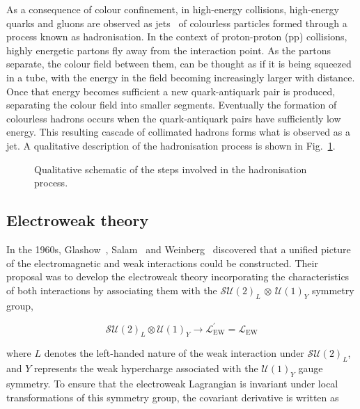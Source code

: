 As a consequence of colour confinement, in high-energy collisions, high-energy quarks and gluons are observed as jets~\cite{Hadronisation_Jets} of colourless particles formed through a process known as hadronisation. In the context of proton-proton (pp) collisions, highly energetic partons fly away from the interaction point. As the partons separate, the colour field between them, can be thought as if it is being squeezed in a tube, with the energy in the field becoming increasingly larger with distance. Once that energy becomes sufficient a new quark-antiquark pair is produced, separating the colour field into smaller segments. Eventually the formation of colourless hadrons occurs when the quark-antiquark pairs have sufficiently low energy. This resulting cascade of collimated hadrons forms what is observed as a jet. A qualitative description of the hadronisation process is shown in Fig.~\ref{Figure:Introduction_ColourConfinement}.

\begin{figure}[h]
    \centering
    
    \caption{Qualitative schematic of the steps involved in the hadronisation process.}
    \label{Figure:Introduction_ColourConfinement}
\end{figure}

\subsection{Electroweak theory}

In the 1960s, Glashow~\cite{Glashow_1}, Salam~\cite{Salam_1} and Weinberg~\cite{Weinberg_1} discovered that a unified picture of the electromagnetic and weak interactions could be constructed. Their proposal was to develop the electroweak theory incorporating the characteristics of both interactions by associating them with the $\mathcal{SU}(2)_{L}$ $\otimes$ $\mathcal{U(1)}_{Y}$ symmetry group,

\begin{equation}
    \mathcal{SU}(2)_L \otimes \mathcal{U}(1)_Y \rightarrow \mathcal{L}^{\prime}_{\text{EW}} = \mathcal{L}_{\text{EW}}
\end{equation}

where $L$ denotes the left-handed nature of the weak interaction under $\mathcal{SU}(2)_L$, and $Y$ represents the weak hypercharge associated with the $\mathcal{U}(1)_Y$ gauge symmetry. To ensure that the electroweak Lagrangian is invariant under local transformations of this symmetry group, the covariant derivative is written as

